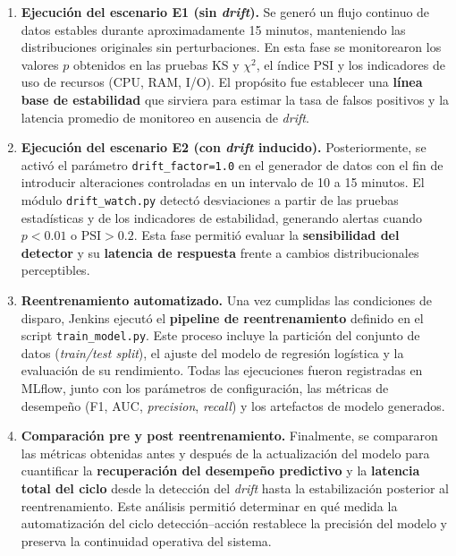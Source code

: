 \begin{enumerate}
\item \textbf{Ejecución del escenario E1 (sin \textit{drift}).}  
Se generó un flujo continuo de datos estables durante aproximadamente 15 minutos, manteniendo las distribuciones originales sin perturbaciones.  
En esta fase se monitorearon los valores \(p\) obtenidos en las pruebas KS y $\chi^2$, el índice \(\mathrm{PSI}\) y los indicadores de uso de recursos (CPU, RAM, I/O).  
El propósito fue establecer una \textbf{línea base de estabilidad} que sirviera para estimar la tasa de falsos positivos y la latencia promedio de monitoreo en ausencia de \textit{drift}.

\item \textbf{Ejecución del escenario E2 (con \textit{drift} inducido).}  
Posteriormente, se activó el parámetro \texttt{drift\_factor=1.0} en el generador de datos con el fin de introducir alteraciones controladas en un intervalo de 10 a 15 minutos.  
El módulo \texttt{drift\_watch.py} detectó desviaciones a partir de las pruebas estadísticas y de los indicadores de estabilidad, generando alertas cuando \(p < 0.01\) o \(\mathrm{PSI} > 0.2\).  
Esta fase permitió evaluar la \textbf{sensibilidad del detector} y su \textbf{latencia de respuesta} frente a cambios distribucionales perceptibles.

\item \textbf{Reentrenamiento automatizado.}  
Una vez cumplidas las condiciones de disparo, Jenkins ejecutó el \textbf{pipeline de reentrenamiento} definido en el script \texttt{train\_model.py}.  
Este proceso incluye la partición del conjunto de datos (\textit{train/test split}), el ajuste del modelo de regresión logística y la evaluación de su rendimiento.  
Todas las ejecuciones fueron registradas en MLflow, junto con los parámetros de configuración, las métricas de desempeño (F1, AUC, \textit{precision}, \textit{recall}) y los artefactos de modelo generados.

\item \textbf{Comparación pre y post reentrenamiento.}  
Finalmente, se compararon las métricas obtenidas antes y después de la actualización del modelo para cuantificar la \textbf{recuperación del desempeño predictivo} y la \textbf{latencia total del ciclo} desde la detección del \textit{drift} hasta la estabilización posterior al reentrenamiento.  
Este análisis permitió determinar en qué medida la automatización del ciclo detección–acción restablece la precisión del modelo y preserva la continuidad operativa del sistema.
\end{enumerate}

